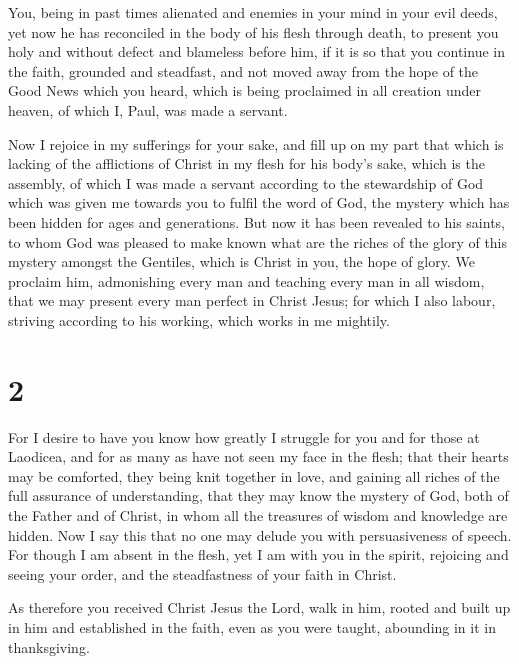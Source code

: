  You, being in past times alienated and enemies in your
mind in your evil deeds,  yet now he has reconciled in
the body of his flesh through death, to present you holy and without
defect and blameless before him,  if it is so that you
continue in the faith, grounded and steadfast, and not moved away from
the hope of the Good News which you heard, which is being proclaimed in
all creation under heaven, of which I, Paul, was made a servant.

 Now I rejoice in my sufferings for your sake, and fill
up on my part that which is lacking of the afflictions of Christ in my
flesh for his body's sake, which is the assembly,  of
which I was made a servant according to the stewardship of God which was
given me towards you to fulfil the word of God,  the
mystery which has been hidden for ages and generations. But now it has
been revealed to his saints,  to whom God was pleased to
make known what are the riches of the glory of this mystery amongst the
Gentiles, which is Christ in you, the hope of glory.  We
proclaim him, admonishing every man and teaching every man in all
wisdom, that we may present every man perfect in Christ Jesus;
 for which I also labour, striving according to his
working, which works in me mightily.

\hypertarget{section-1}{%
\section{2}\label{section-1}}

 For I desire to have you know how greatly I struggle for
you and for those at Laodicea, and for as many as have not seen my face
in the flesh;  that their hearts may be comforted, they
being knit together in love, and gaining all riches of the full
assurance of understanding, that they may know the mystery of God, both
of the Father and of Christ,  in whom all the treasures of
wisdom and knowledge are hidden.  Now I say this that no
one may delude you with persuasiveness of speech.  For
though I am absent in the flesh, yet I am with you in the spirit,
rejoicing and seeing your order, and the steadfastness of your faith in
Christ.

 As therefore you received Christ Jesus the Lord, walk in
him,  rooted and built up in him and established in the
faith, even as you were taught, abounding in it in thanksgiving.

